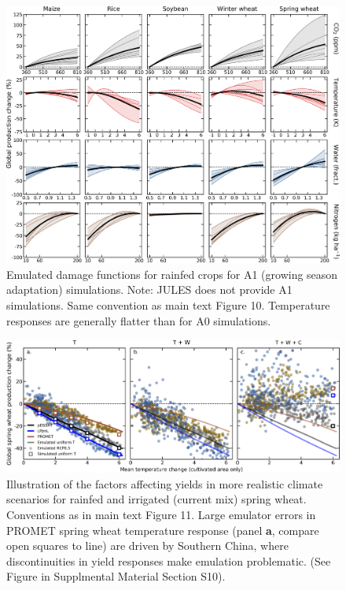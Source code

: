 \documentclass[12pt]{article}
\begin{document}
{{\begin{figure}[h!]
  \centering
  \includegraphics[width = 16.3cm]{em_CTWN_all_crops_A1.png}
  \caption{
  Emulated damage functions for rainfed crops for A1 (growing season adaptation) simulations. Note: JULES does not provide A1 simulations. Same convention as main text Figure 10.
  Temperature responses are generally flatter than for A0 simulations.
  }
  \label{fig:all_dims}
\end{figure}

\clearpage

\begin{figure}[h!]
  \centering
  \includegraphics[width = 16.3cm]{LPJmL_pDSSAT_PROMET_RCP85_all_cases_spring_wheat.png}
  \caption{
	  Illustration of the factors affecting yields in more realistic climate scenarios for rainfed and irrigated (current mix) spring wheat. Conventions as in  main text Figure 11. Large emulator errors in PROMET spring wheat temperature response (panel \textbf{a}, compare open squares to line) are driven by Southern China, where discontinuities in yield responses make emulation problematic. (See Figure in Supplmental Material Section S10).
	  }
\end{figure}

}}
\end{document}
